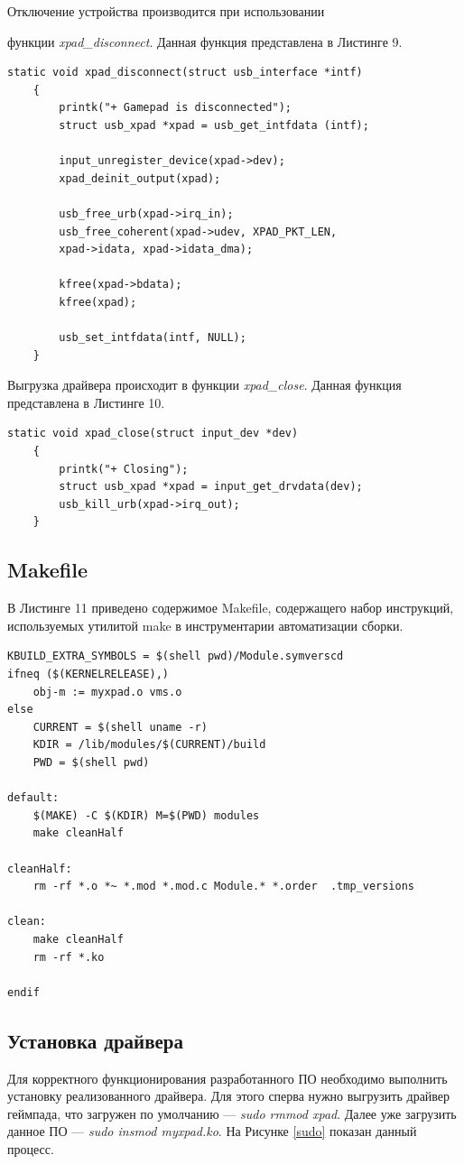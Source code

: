 Отключение устройства производится при использовании 

функции \textit{xpad\_disconnect}.
Данная функция представлена в Листинге 9.

\begin{lstlisting}[caption=Функция xpad\_disconnect]
	static void xpad_disconnect(struct usb_interface *intf)
	{
		printk("+ Gamepad is disconnected");
		struct usb_xpad *xpad = usb_get_intfdata (intf);
		
		input_unregister_device(xpad->dev);
		xpad_deinit_output(xpad);									
		
		usb_free_urb(xpad->irq_in);
		usb_free_coherent(xpad->udev, XPAD_PKT_LEN,
		xpad->idata, xpad->idata_dma);
		
		kfree(xpad->bdata);
		kfree(xpad);
		
		usb_set_intfdata(intf, NULL);
	}
\end{lstlisting}

Выгрузка драйвера происходит в функции \textit{xpad\_close}.
Данная функция представлена в Листинге 10.

\begin{lstlisting}[caption=Функция xpad\_close]
	static void xpad_close(struct input_dev *dev)
	{
		printk("+ Closing");
		struct usb_xpad *xpad = input_get_drvdata(dev);
		usb_kill_urb(xpad->irq_out);
	}
\end{lstlisting}

\subsection{Makefile}
В Листинге 11 приведено содержимое Makefile, содержащего набор
инструкций, используемых утилитой make в инструментарии автоматизации
сборки. 

\begin{lstlisting}[caption=Makefile]
KBUILD_EXTRA_SYMBOLS = $(shell pwd)/Module.symverscd
ifneq ($(KERNELRELEASE),)
	obj-m := myxpad.o vms.o
else
	CURRENT = $(shell uname -r)
	KDIR = /lib/modules/$(CURRENT)/build
	PWD = $(shell pwd)

default:
	$(MAKE) -C $(KDIR) M=$(PWD) modules
	make cleanHalf

cleanHalf:
	rm -rf *.o *~ *.mod *.mod.c Module.* *.order  .tmp_versions

clean:
	make cleanHalf
	rm -rf *.ko

endif
\end{lstlisting}

\subsection{Установка драйвера}
Для корректного функционирования разработанного ПО необходимо
выполнить установку реализованного драйвера. Для этого сперва нужно выгрузить драйвер геймпада, что загружен по умолчанию ---
\textit{sudo rmmod xpad}. Далее уже загрузить данное ПО --- \textit{sudo insmod myxpad.ko}. На Рисунке \ref{sudo} показан данный процесс.

